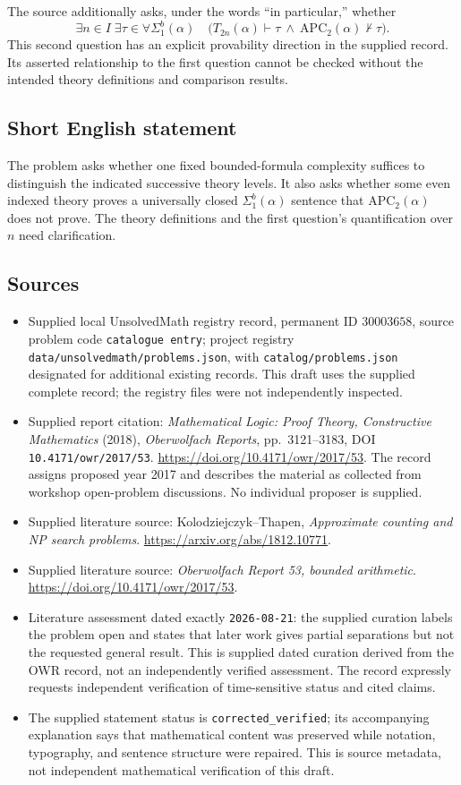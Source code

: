 \documentclass[11pt]{article}
\begin{document}
The source additionally asks, under the words ``in particular,'' whether
\[
\exists n\in I\;\exists\tau\in\forall\Sigma_1^b(\alpha)\quad
\bigl(T_{2n}(\alpha)\vdash\tau
\ \land\ \mathrm{APC}_2(\alpha)\nvdash\tau\bigr).
\]
This second question has an explicit provability direction in the supplied record. Its asserted relationship to the first question cannot be checked without the intended theory definitions and comparison results.
\subsection{Short English statement}
The problem asks whether one fixed bounded-formula complexity suffices to distinguish the indicated successive theory levels. It also asks whether some even indexed theory proves a universally closed \(\Sigma_1^b(\alpha)\) sentence that \(\mathrm{APC}_2(\alpha)\) does not prove. The theory definitions and the first question's quantification over \(n\) need clarification.
\subsection{Sources}
\begin{itemize}
\item Supplied local UnsolvedMath registry record, permanent ID \(30003658\), source problem code \texttt{catalogue entry}; project registry \texttt{data/unsolvedmath/problems.json}, with \texttt{catalog/problems.json} designated for additional existing records. This draft uses the supplied complete record; the registry files were not independently inspected.
\item Supplied report citation: \emph{Mathematical Logic: Proof Theory, Constructive Mathematics} (2018), \emph{Oberwolfach Reports}, pp.\ 3121--3183, DOI \texttt{10.4171/owr/2017/53}. \url{https://doi.org/10.4171/owr/2017/53}. The record assigns proposed year 2017 and describes the material as collected from workshop open-problem discussions. No individual proposer is supplied.
\item Supplied literature source: Kolodziejczyk--Thapen, \emph{Approximate counting and NP search problems}. \url{https://arxiv.org/abs/1812.10771}.
\item Supplied literature source: \emph{Oberwolfach Report 53, bounded arithmetic}. \url{https://doi.org/10.4171/owr/2017/53}.
\item Literature assessment dated exactly \texttt{2026-08-21}: the supplied curation labels the problem open and states that later work gives partial separations but not the requested general result. This is supplied dated curation derived from the OWR record, not an independently verified assessment. The record expressly requests independent verification of time-sensitive status and cited claims.
\item The supplied statement status is \texttt{corrected\_verified}; its accompanying explanation says that mathematical content was preserved while notation, typography, and sentence structure were repaired. This is source metadata, not independent mathematical verification of this draft.
\end{itemize}
\end{document}
